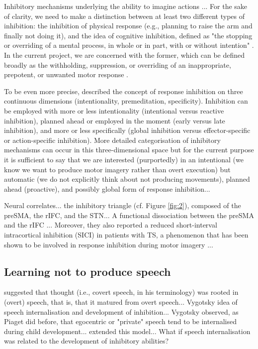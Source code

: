 \documentclass[utf8]{template/frontiersSCNS} %
\begin{document}
Inhibitory mechanisms underlying the ability to imagine actions \citep{guillot_imagining_2012, schwoebel_man_2002}... For the sake of clarity, we need to make a distinction between at least two different types of inhibition: the inhibition of physical response (e.g., planning to raise the arm and finally not doing it), and the idea of cognitive inhibition, defined as "the stopping or overriding of a mental process, in whole or in part, with or without intention" \citep{gorfein_concept_2007}. In the current project, we are concerned with the former, which can be defined broadly as the withholding, suppression, or overriding of an inappropriate, prepotent, or unwanted motor response \citep{aron_neural_2007, oshea_go_2018}.

To be even more precise, \cite{ridderinkhof_dont_2014} described the concept of response inhibition on three continuous dimensions (intentionality, premeditation, specificity). Inhibition can be employed with more or less intentionality (intentional versus reactive inhibition), planned ahead or employed in the moment (early versus late inhibition), and more or less specifically (global inhibition versus effector-specific or action-specific inhibition). More detailed categorisation of inhibitory mechanisms can occur in this three-dimensional space but for the current purpose it is sufficient to say that we are interested (purportedly) in an intentional (we know we want to produce motor imagery rather than overt execution) but automatic (we do not explicitly think about not producing movements), planned ahead (proactive), and possibly global form of response inhibition...

Neural correlates... the inhibitory triangle (cf. Figure \ref{fig:2}), composed of the preSMA, the rIFC, and the STN... A functional dissociation between the preSMA and the rIFC \citep{diesburg_pause-then-cancel_2021}... Moreover, they also reported a reduced short-interval intracortical inhibition (SICI) in patients with TS, a phenomenon that has been shown to be involved in response inhibition during motor imagery \citep{neige_unravelling_2020}...

\subsection{Learning not to produce speech}

\cite{watson_psychology_1919} suggested that thought (i.e., covert speech, in his terminology) was rooted in (overt) speech, that is, that it matured from overt speech... Vygotsky idea of speech internalisation and development of inhibition... Vygotsky observed, as Piaget did before, that egocentric or "private" speech tend to be internalised during child development... \cite{fernyhough_alien_2004} extended this model... What if speech internalisation was related to the development of inhibitory abilities?
\end{document}
